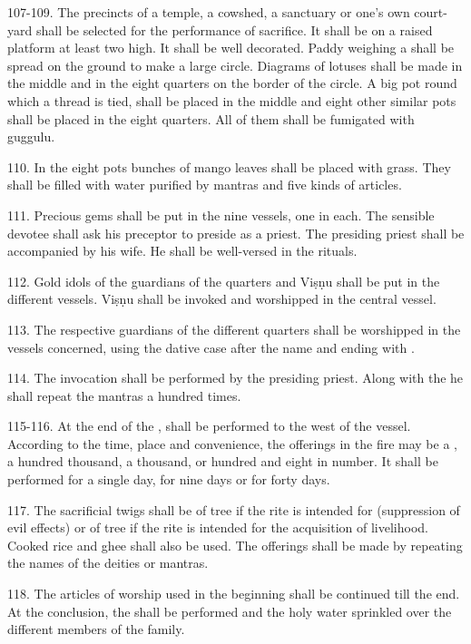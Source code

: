 107-109. The precincts of a temple, a cowshed, a sanctuary or one’s own
court-yard shall be selected for the performance of sacrifice. It shall be on a
raised platform at least two  high. It shall be well decorated. Paddy
weighing a  shall be spread on the ground to make a large circle.
Diagrams of lotuses shall be made in the middle and in the eight quarters on
the border of the circle. A big pot round which a thread is tied, shall be
placed in the middle and eight other similar pots shall be placed in the eight
quarters. All of them shall be fumigated with guggulu.

110. In the eight pots bunches of mango leaves shall be placed with 
grass. They shall be filled with water purified by mantras and five kinds of
articles.

111. Precious gems shall be put in the nine vessels, one in each. The sensible
devotee shall ask his preceptor to preside as a priest. The presiding priest
shall be accompanied by his wife. He shall be well-versed in the rituals.

112. Gold idols of the guardians of the quarters and Viṣṇu shall be put in
the different vessels. Viṣṇu shall be invoked and worshipped in the central
vessel.

113. The respective guardians of the different quarters shall be worshipped in
the vessels concerned, using the dative case after the name and ending with
.

114. The invocation shall be performed by the presiding priest. Along with
the  he shall repeat the mantras a hundred times.

115-116. At the end of the ,  shall be performed to the west
of the vessel. According to the time, place and convenience, the offerings in
the fire may be a , a hundred thousand, a thousand, or hundred and
eight in number. It shall be performed for a single day, for nine days or for
forty days.

117. The sacrificial twigs shall be of  tree if the rite is intended
for  (suppression of evil effects) or of  tree if the rite
is intended for the acquisition of livelihood. Cooked rice and ghee shall also
be used. The offerings shall be made by repeating the names of the deities or
mantras.

118. The articles of worship used in the beginning shall be continued till
the end. At the conclusion, the  shall be performed and
the holy water sprinkled over the different members of the family.

